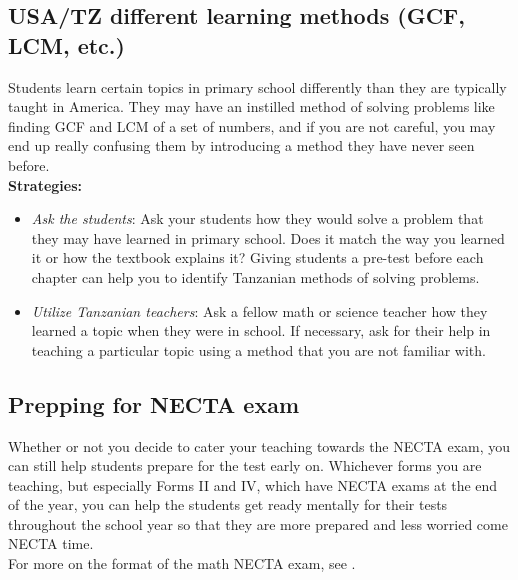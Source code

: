 \subsection{USA/TZ different learning methods (GCF, LCM, etc.)}
Students learn certain topics in primary school differently than they are typically taught in America. They may have an instilled method of solving problems like finding GCF and LCM of a set of numbers, and if you are not careful, you may end up really confusing them by introducing a method they have never seen before.\\

\textbf{Strategies:}
\begin{itemize}
\item\emph{Ask the students}: Ask your students how they would solve a problem that they may have learned in primary school. Does it match the way you learned it or how the textbook explains it? Giving students a pre-test before each chapter can help you to identify Tanzanian methods of solving problems.

\item\emph{Utilize Tanzanian teachers}: Ask a fellow math or science teacher how they learned a topic when they were in school. If necessary, ask for their help in teaching a particular topic using a method that you are not familiar with.
\end{itemize}

\subsection{Prepping for NECTA exam}
Whether or not you decide to cater your teaching towards the NECTA exam, you can still help students prepare for the test early on. Whichever forms you are teaching, but especially Forms II and IV, which have NECTA exams at the end of the year, you can help the students get ready mentally for their tests throughout the school year so that they are more prepared and less worried come NECTA time.\\
For more on the format of the math NECTA exam, see .\\

